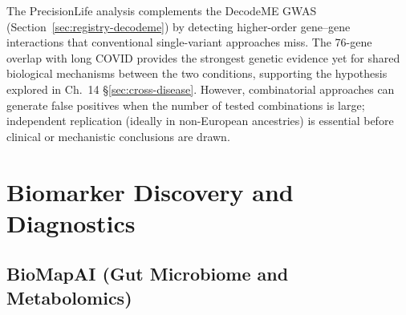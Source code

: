 The PrecisionLife analysis complements the DecodeME GWAS
(Section~\ref{sec:registry-decodeme}) by detecting higher-order gene--gene
interactions that conventional single-variant approaches miss.  The 76-gene
overlap with long COVID provides the strongest genetic evidence yet for shared
biological mechanisms between the two conditions, supporting the hypothesis
explored in Ch.~14 \S\ref{sec:cross-disease}.  However, combinatorial
approaches can generate false positives when the number of tested combinations
is large; independent replication (ideally in non-European ancestries) is
essential before clinical or mechanistic conclusions are drawn.
\cite{PrecisionLife2025decodeme}

\section{Biomarker Discovery and Diagnostics}
\label{sec:registry-biomarker}

\subsection{BioMapAI (Gut Microbiome and Metabolomics)}
\label{sec:registry-biomapai}

